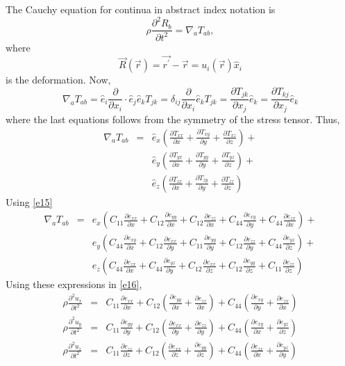 \documentclass{article}
\newcommand{\op}{\prime}
\newcommand{\pdt}[2]{\frac{\partial{#1}}{\partial{#2}}}
\newcommand{\spdt}[2]{\frac{\partial^2{#1}}{\partial{#2}^2}}
\begin{document}
The Cauchy equation for continua in abstract index notation is
\begin{equation}\label{e16}
\rho\frac{\partial^2 R_b}{\partial t^2} = \nabla_{a}T_{ab},
\end{equation}
where 
\begin{equation}\label{e17}
\vec{R}(\vec{r}) = \vec{r^\op} - \vec{r} = u_i(\vec{r})\hat{x}_i
\end{equation}
is the deformation. Now,
\[
\nabla_a T_{ab} = \hat{e}_i\frac{\partial}{\partial x_i}\cdot\hat{e}_j\hat{e}_k
T_{jk} = \delta_{ij}\frac{\partial}{\partial x_i}\hat{e}_k T_{jk} = 
\frac{\partial T_{jk}}{\partial x_j}\hat{e}_k = 
\frac{\partial T_{kj}}{\partial x_j}\hat{e}_k
\]
where the last equations follows from the symmetry of the stress tensor. Thus,
\begin{eqnarray*}
\nabla_a T_{ab} &=& \hat{e}_x\left(\frac{\partial T_{xx}}{\partial x} + 
\frac{\partial T_{xy}}{\partial y}+\frac{\partial T_{xz}}{\partial z}\right)+\\
 & & \hat{e}_y\left(\frac{\partial T_{yx}}{\partial x} + 
\frac{\partial T_{yy}}{\partial y}+\frac{\partial T_{yz}}{\partial z}\right)+\\
 & & \hat{e}_z\left(\frac{\partial T_{zx}}{\partial x} + 
\frac{\partial T_{zy}}{\partial y} + \frac{\partial T_{zz}}{\partial z}\right)
\end{eqnarray*}
Using \eqref{e15}
\begin{eqnarray*}
\nabla_a T_{ab} &=& \hat{e}_x\left(C_{11}\pdt{e_{xx}}{x} + C_{12}\pdt{e_{yy}}{x}
+C_{12}\pdt{e_{zz}}{x}+C_{44}\pdt{e_{xy}}{y} + C_{44}\pdt{e_{zx}}{x}\right)+\\
& & \hat{e}_y\left(C_{44}\pdt{e_{xy}}{x} + C_{12}\pdt{e_{xx}}{y} + 
C_{11}\pdt{e_{yy}}{y} + C_{12}\pdt{e_{zz}}{y} + C_{44}\pdt{e_{yz}}{z}\right)+\\
& & \hat{e}_z\left(C_{44}\pdt{e_{zx}}{x} + C_{44}\pdt{e_{yz}}{y} +
C_{12}\pdt{e_{xx}}{z} + C_{12}\pdt{e_{yy}}{z} + C_{11}\pdt{e_{zz}}{z}\right)
\end{eqnarray*}
Using these expressions in \eqref{e16},
\begin{eqnarray*}
\rho\spdt{u_x}{t} &=& C_{11}\pdt{e_{xx}}{x} + C_{12}\left(\pdt{e_{yy}}{x} +
\pdt{e_{zz}}{x}\right) + C_{44}\left(\pdt{e_{xy}}{y} + \pdt{e_{zx}}{x}\right) \\
\rho\spdt{u_y}{t} &=& C_{11}\pdt{e_{yy}}{y} + C_{12}\left(\pdt{e_{xx}}{y} +
\pdt{e_{zz}}{y}\right) + C_{44}\left(\pdt{e_{xy}}{x} + \pdt{e_{yz}}{z}\right) \\
\rho\spdt{u_z}{t} &=& C_{11}\pdt{e_{zz}}{z} + C_{12}\left(\pdt{e_{xx}}{z} +
\pdt{e_{yy}}{z}\right) + C_{44}\left(\pdt{e_{zx}}{x} + \pdt{e_{yz}}{y}\right)
\end{eqnarray*}
\end{document}

